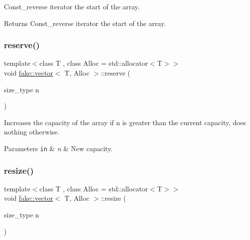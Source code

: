 Const\+\_\+reverse iterator the start of the array. 

\begin{DoxyReturn}{Returns}
Const\+\_\+reverse iterator the start of the array. 
\end{DoxyReturn}
\mbox{\label{classfake_1_1vector_a1390854cc51f7b83f4b871fe84b8015b}} 
\subsubsection{\texorpdfstring{reserve()}{reserve()}}
{\footnotesize\ttfamily template$<$class T , class Alloc  = std\+::allocator$<$\+T$>$$>$ \\
void \mbox{\hyperlink{classfake_1_1vector}{fake\+::vector}}$<$ T, Alloc $>$\+::reserve (\begin{DoxyParamCaption}\item[{size\+\_\+type}]{n }\end{DoxyParamCaption})\hspace{0.3cm}{\ttfamily [inline]}}



Increases the capacity of the array if n is greater than the current capacity, does nothing otherwise. 


\begin{DoxyParams}[1]{Parameters}
\mbox{\tt in}  & {\em n} & New capacity. \\
\hline
\end{DoxyParams}
\mbox{\label{classfake_1_1vector_a1c67c134cdc8d365af937918c9fc2a61}} 
\subsubsection{\texorpdfstring{resize()}{resize()}\hspace{0.1cm}{\footnotesize\ttfamily [1/2]}}
{\footnotesize\ttfamily template$<$class T , class Alloc  = std\+::allocator$<$\+T$>$$>$ \\
void \mbox{\hyperlink{classfake_1_1vector}{fake\+::vector}}$<$ T, Alloc $>$\+::resize (\begin{DoxyParamCaption}\item[{size\+\_\+type}]{n }\end{DoxyParamCaption})\hspace{0.3cm}{\ttfamily [inline]}}



